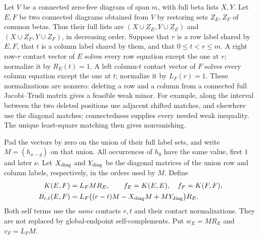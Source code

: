 \documentclass[11pt,a4paper]{amsart}
\numberwithin{equation}{section}
\theoremstyle{plain}
\theoremstyle{definition}
\begin{document}
Let \(V\) be a connected zero-free diagram of span \(m\), with full beta lists
\(X,Y\).  Let \(E,F\) be two connected diagrams obtained from \(V\) by restoring
sets \(Z_E,Z_F\) of common betas.  Thus their full lists are
\((X\cup Z_E,Y\cup Z_E)\) and \((X\cup Z_F,Y\cup Z_F)\), in decreasing
order.  Suppose that \(r\) is a row label shared by \(E,F\), that \(t\) is a
column label shared by them, and that \(0\le t<r\le m\).
A right row-\(r\) contact vector of \(E\) solves every row equation except the
one at \(r\); normalize it by \(R_E(t)=1\).  A left column-\(t\) contact vector of
\(F\) solves every column equation except the one at \(t\); normalize it by
\(L_F(r)=1\).  These normalizations are nonzero: deleting a row and a column
from a connected full Jacobi--Trudi matrix gives a feasible weak minor.
For example, along the interval between the two deleted positions use
adjacent shifted matches, and elsewhere use the diagonal matches;
connectedness supplies every needed weak inequality.  The unique
least-square matching then gives nonvanishing.

Pad the vectors by zero on the union of their full label sets, and write
\(M=(h_{x-y})\) on that union.  All occurrences of \(h_0\) have the same value,
first \(1\) and later \(\nu\).
Let \(X_{\rm diag}\) and \(Y_{\rm diag}\) be the diagonal matrices of the
union row and column labels, respectively, in the orders used by \(M\).
Define
\begin{equation}\label{eq:contact-definitions}
 \begin{aligned}
 K(E,F)&=L_FMR_E,\qquad f_E=K(E,E),\quad f_F=K(F,F),\\
 B_{r,t}(E,F)&=
 L_F\bigl((r-t)M-X_{\rm diag}M+MY_{\rm diag}\bigr)R_E.
 \end{aligned}
\end{equation}
Both self terms use the \emph{same} contacts \(r,t\) and their contact
normalizations.  They are not replaced by global-endpoint self-complements.
Put \(w_E=MR_E\) and \(v_F=L_FM\).
\end{document}
